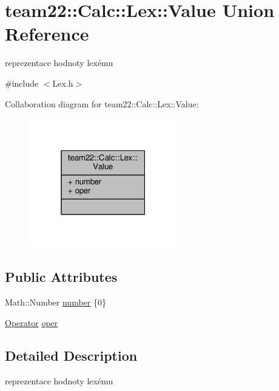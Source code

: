 \hypertarget{unionteam22_1_1_calc_1_1_lex_1_1_value}{}\section{team22\+:\+:Calc\+:\+:Lex\+:\+:Value Union Reference}
\label{unionteam22_1_1_calc_1_1_lex_1_1_value}


reprezentace hodnoty lexému  




{\ttfamily \#include $<$Lex.\+h$>$}



Collaboration diagram for team22\+:\+:Calc\+:\+:Lex\+:\+:Value\+:
\nopagebreak
\begin{figure}[H]
\begin{center}
\leavevmode
\includegraphics[width=183pt]{unionteam22_1_1_calc_1_1_lex_1_1_value__coll__graph}
\end{center}
\end{figure}
\subsection*{Public Attributes}
\begin{DoxyCompactItemize}
\item 
Math\+::\+Number \hyperlink{unionteam22_1_1_calc_1_1_lex_1_1_value_a86e2e3ea0c887ca50885bcdb8f1ec5ce}{number} \{0\}
\item 
\hyperlink{classteam22_1_1_calc_1_1_lex_a61d29fc4878a3b36d2de2f13c56ed932}{Operator} \hyperlink{unionteam22_1_1_calc_1_1_lex_1_1_value_ade46fa860d495ce4d431d3934210579d}{oper}
\end{DoxyCompactItemize}


\subsection{Detailed Description}
reprezentace hodnoty lexému 

